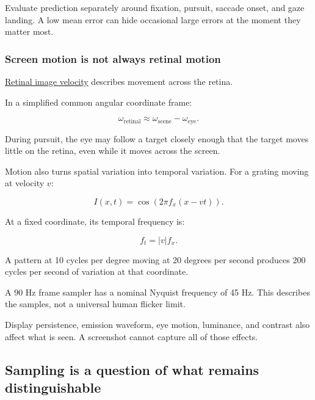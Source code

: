 Evaluate prediction separately around fixation, pursuit, saccade onset, and gaze landing. A low mean error can hide occasional large errors at the moment they matter most.

\subsubsection{Screen motion is not always retinal motion}\label{04-visual-computing-ii-ch043-screen-motion-is-not-always-retinal-motion}

\hypertarget{04-visual-computing-ii-ch043-screen-motion-is-not-always-retinal-motion}{}

\hyperref[appendix-70895739febb]{Retinal image velocity} describes movement across the retina.

In a simplified common angular coordinate frame:

\[
\omega_{\mathrm{retinal}}
\approx\omega_{\mathrm{scene}}-\omega_{\mathrm{eye}}.
\]

During pursuit, the eye may follow a target closely enough that the target moves little on the retina, even while it moves across the screen.

Motion also turns spatial variation into temporal variation. For a grating moving at velocity \(v\):

\[
I(x,t)=\cos\!\left(2\pi f_x(x-vt)\right).
\]

At a fixed coordinate, its temporal frequency is:

\[
f_t=|v|f_x.
\]

A pattern at 10 cycles per degree moving at 20 degrees per second produces 200 cycles per second of variation at that coordinate.

A 90 Hz frame sampler has a nominal Nyquist frequency of 45 Hz. This describes the samples, not a universal human flicker limit.

Display persistence, emission waveform, eye motion, luminance, and contrast also affect what is seen. A screenshot cannot capture all of those effects.

\subsection{Sampling is a question of what remains distinguishable}\label{04-visual-computing-ii-ch043-sampling-is-a-question-of-what-remains-distinguishable}

\hypertarget{04-visual-computing-ii-ch043-sampling-is-a-question-of-what-remains-distinguishable}{}


